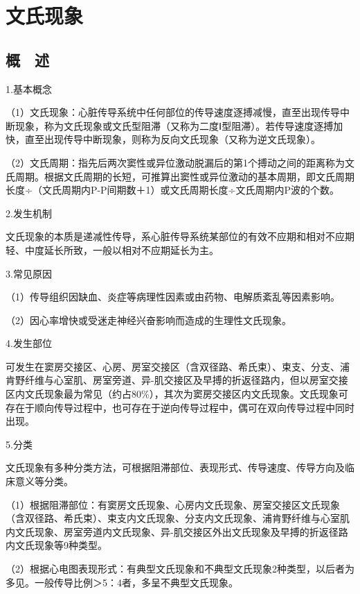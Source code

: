 \protect\hypertarget{text00025.html}{}{}

\protect\hypertarget{text00025.htmlux5cux23chapter25}{}{}

\chapter{文氏现象}

\protect\hypertarget{text00025.htmlux5cux23subid306}{}{}

\section{概　述}

1.基本概念

（1）文氏现象：心脏传导系统中任何部位的传导速度逐搏减慢，直至出现传导中断现象，称为文氏现象或文氏型阻滞（又称为二度Ⅰ型阻滞）。若传导速度逐搏加快，直至出现传导中断现象，则称为反向文氏现象（又称为逆文氏现象）。

（2）文氏周期：指先后两次窦性或异位激动脱漏后的第1个搏动之间的距离称为文氏周期。根据文氏周期的长短，可推算出窦性或异位激动的基本周期，即文氏周期长度÷（文氏周期内P-P间期数＋1）或文氏周期长度÷文氏周期内P波的个数。

2.发生机制

文氏现象的本质是递减性传导，系心脏传导系统某部位的有效不应期和相对不应期轻、中度延长所致，一般以相对不应期延长为主。

3.常见原因

（1）传导组织因缺血、炎症等病理性因素或由药物、电解质紊乱等因素影响。

（2）因心率增快或受迷走神经兴奋影响而造成的生理性文氏现象。

4.发生部位

可发生在窦房交接区、心房、房室交接区（含双径路、希氏束）、束支、分支、浦肯野纤维与心室肌、房室旁道、异-肌交接区及早搏的折返径路内，但以房室交接区内文氏现象最为常见（约占80\%），其次为窦房交接区内文氏现象。文氏现象可存在于顺向传导过程中，也可存在于逆向传导过程中，偶可在双向传导过程中同时出现。

5.分类

文氏现象有多种分类方法，可根据阻滞部位、表现形式、传导速度、传导方向及临床意义等分类。

（1）根据阻滞部位：有窦房文氏现象、心房内文氏现象、房室交接区文氏现象（含双径路、希氏束）、束支内文氏现象、分支内文氏现象、浦肯野纤维与心室肌内文氏现象、房室旁道内文氏现象、异-肌交接区外出文氏现象及早搏的折返径路内文氏现象等9种类型。

（2）根据心电图表现形式：有典型文氏现象和不典型文氏现象2种类型，以后者为多见。一般传导比例＞5：4者，多呈不典型文氏现象。

